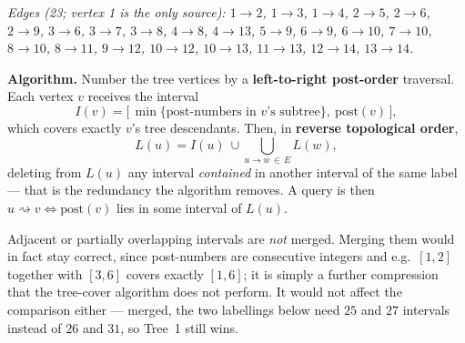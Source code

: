 \documentclass[11pt]{article}
\newcommand{\figdata}[1]{%
  \par\vspace{-0.6em}%
  {\centering\small\textit{#1}\par}%
  \vspace{0.4em}}
\begin{document}
\begin{center}
\end{center}
\figdata{Edges (23; vertex 1 is the only source):
$1{\to}2$, $1{\to}3$, $1{\to}4$, $2{\to}5$, $2{\to}6$, $2{\to}9$, $3{\to}6$,
$3{\to}7$, $3{\to}8$, $4{\to}8$, $4{\to}13$, $5{\to}9$, $6{\to}9$, $6{\to}10$,
$7{\to}10$, $8{\to}10$, $8{\to}11$, $9{\to}12$, $10{\to}12$, $10{\to}13$,
$11{\to}13$, $12{\to}14$, $13{\to}14$.}

\noindent\textbf{\color{accent!85!black}Algorithm.} Number the tree vertices by a
\textbf{left-to-right post-order} traversal. Each vertex $v$ receives the interval
\[
  I(v)=\bigl[\,\min\{\text{post-numbers in }v\text{'s subtree}\},\ \mathrm{post}(v)\,\bigr],
\]
which covers exactly $v$'s tree descendants. Then, in \textbf{reverse topological order},
\[
  L(u)=I(u)\ \cup \bigcup_{u\to w\,\in\,E} L(w),
\]
deleting from $L(u)$ any interval \emph{contained} in another interval of the same label ---
that is the redundancy the algorithm removes. A query is then
$u\rightsquigarrow v \iff \mathrm{post}(v)$ lies in some interval of $L(u)$.

Adjacent or partially overlapping intervals are \emph{not} merged. Merging them would in
fact stay correct, since post-numbers are consecutive integers and e.g.\ $[1,2]$ together
with $[3,6]$ covers exactly $[1,6]$; it is simply a further compression that the tree-cover
algorithm does not perform. It would not affect the comparison either --- merged, the two
labellings below need $25$ and $27$ intervals instead of $26$ and $31$, so Tree~1 still
wins.
\end{document}
